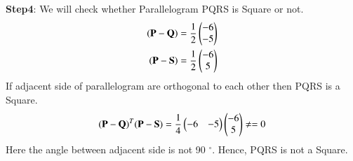 \textbf{Step4}: We will check whether Parallelogram PQRS is Square or not.
\begin{align}
(\mathbf{P-Q})=\frac{1}{2}\begin{pmatrix}-6 \\-5\end{pmatrix} \label{eqn}\\
(\mathbf{P-S})=\frac{1}{2}\begin{pmatrix}-6\\5\end{pmatrix} \label{eqn}\\
\end{align}
If adjacent side of parallelogram are orthogonal to each other then PQRS is a Square.
\begin{align}
(\mathbf{P-Q})^T(\mathbf{P-S})=\frac{1}{4}\begin{pmatrix}-6 & -5\end{pmatrix}\begin{pmatrix}-6 \\ 5\end{pmatrix} \ne = 0 \label{eqn}\\
\end{align}
Here the angle between adjacent side is not 90 $^{\circ}$.
Hence, PQRS is not a Square.
